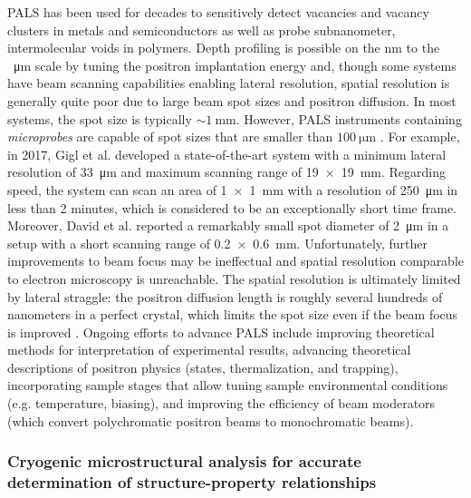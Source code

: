 \documentclass[%
 aip,
 amsmath,amssymb,
 reprint,%
floatfix]{revtex4-1}
\begin{document}
PALS has been used for decades to sensitively detect vacancies and vacancy clusters in metals and semiconductors\cite{Schultz1988, Gidley2006} as well as probe subnanometer, intermolecular voids in polymers\cite{Pethrick1997, Gidley2006}.  Depth profiling is possible on the nm to the \SI{}{\micro\meter} scale\cite{RevModPhys.60.701, Wagner2018, Peng2005, Gidley2006} by tuning the positron implantation energy and, though some systems have beam scanning capabilities enabling lateral resolution, spatial resolution is generally quite poor due to large beam spot sizes and positron diffusion.  In most systems, the spot size is typically $\sim \SI{1}{\milli\meter}$. However, PALS instruments containing \emph{microprobes} are capable of spot sizes that are smaller than $\SI{100}{\micro\meter}$ \cite{PhysRevLett.87.067402, Gigl2017}. For example, in 2017, Gigl et al.\cite{Gigl2017} developed a state-of-the-art system with a minimum lateral resolution of \SI{33}{\micro\meter} and maximum scanning range of \SI[product-units=power]{19 x 19}{\mm}. Regarding speed, the system can scan an area of \SI[product-units=power]{1 x 1}{\mm} with a resolution of \SI{250}{\micro\meter} in less than 2 minutes, which is considered to be an exceptionally short time frame\cite{Gigl2017}. Moreover, David et al.\cite{PhysRevLett.87.067402} reported a remarkably small spot diameter of \SI{2}{\micro\meter} in a setup with a short scanning range of \SI[product-units=power]{0.2 x 0.6}{\mm}. Unfortunately, further improvements to beam focus may be ineffectual and spatial resolution comparable to electron microscopy is unreachable. The spatial resolution is ultimately limited by lateral straggle: the positron diffusion length is roughly several hundreds of nanometers in a perfect crystal, which limits the spot size even if the beam focus is improved \cite{RevModPhys.60.701}. Ongoing efforts to advance PALS include improving theoretical methods for interpretation of experimental results, advancing theoretical descriptions of positron physics (states, thermalization, and trapping), incorporating sample stages that allow tuning sample environmental conditions (e.g. temperature, biasing), and improving the efficiency of beam moderators (which convert polychromatic positron beams to monochromatic beams)\cite{RevModPhys.60.701}.




\subsubsection{Cryogenic microstructural analysis for accurate determination of structure-property relationships}
\end{document}
